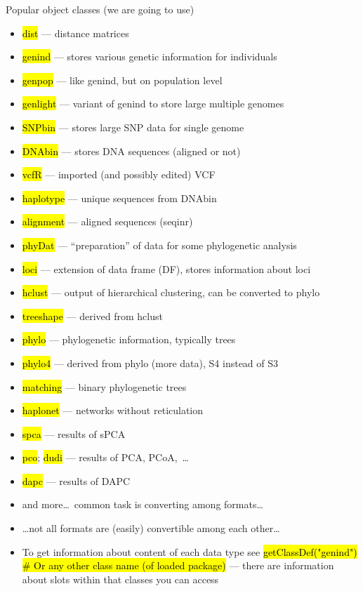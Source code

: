 \documentclass[compress, ucs, xelatex, 11pt, xcolor=svgnames,
  hyperref={
    bookmarks=true,
    unicode=true,
    colorlinks=true,
    pdftitle={Molecular data in R},
    plainpages=false,
    pdfauthor={Vojtech Zeisek},
    pdfsubject={Course about phylogeny and evolution in R},
    pdfcreator={XeLaTeX},
    pdfkeywords={R, evolution, phylogeny, molecular data},
    linkcolor=Tomato,
    anchorcolor=SaddleBrown,
    citecolor=Goldenrod,
    filecolor=DarkMagenta,
    menucolor=Sienna,
    urlcolor=DarkTurquoise,
    pdftex},
  url={hyphens, lowtilde} %
  ]{beamer}
\renewcommand{\texttt}[1]{\hl{\ttfamily #1}}
\begin{document}
\begin{frame}[allowframebreaks]{Popular object classes (we are going to use)}
  \begin{itemize}
    \item \texttt{dist} --- distance matrices
    \item \texttt{genind} --- stores various genetic information for individuals
    \item \texttt{genpop} --- like genind, but on population level
    \item \texttt{genlight} --- variant of genind to store large multiple genomes
    \item \texttt{SNPbin} --- stores large SNP data for single genome
    \item \texttt{DNAbin} --- stores DNA sequences (aligned or not)
    \item \texttt{vcfR} --- imported (and possibly edited) VCF
    \item \texttt{haplotype} --- unique sequences from DNAbin
    \item \texttt{alignment} --- aligned sequences (seqinr)
    \item \texttt{phyDat} --- ``preparation'' of data for some phylogenetic analysis
    \item \texttt{loci} --- extension of data frame (DF), stores information about loci
    \item \texttt{hclust} --- output of hierarchical clustering, can be converted to phylo
    \item \texttt{treeshape} --- derived from hclust
    \item \texttt{phylo} --- phylogenetic information, typically trees
    \item \texttt{phylo4} --- derived from phylo (more data), S4 instead of S3
    \item \texttt{matching} --- binary phylogenetic trees
    \item \texttt{haplonet} --- networks without reticulation
    \item \texttt{spca} --- results of sPCA
    \item \texttt{pco}; \texttt{dudi} --- results of PCA, PCoA,~\ldots
    \item \texttt{dapc} --- results of DAPC
    \item and more\ldots~common task is converting among formats\ldots
    \item \ldots not all formats are (easily) convertible among each other\ldots
    \item To get information about content of each data type see \texttt{getClassDef("genind") \# Or any other class name (of loaded package)} --- there are information about slots within that classes you can access
  \end{itemize}
\end{frame}
\end{document}
